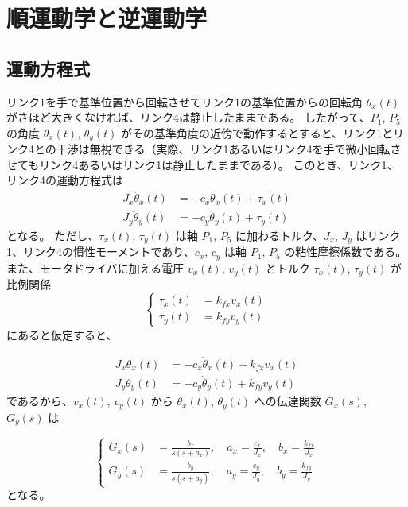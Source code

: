 \section{順運動学と逆運動学}

\subsection{運動方程式}

リンク1を手で基準位置から回転させてリンク1の基準位置からの回転角 $\theta_x(t)$ がさほど大きくなければ、リンク4は静止したままである。
したがって、$P_1$, $P_5$ の角度 $\theta_x(t)$, $\theta_y(t)$ がその基準角度の近傍で動作するとすると、リンク1とリンク4との干渉は無視できる（実際、リンク1あるいはリンク4を手で微小回転させてもリンク4あるいはリンク1は静止したままである）。
このとき、リンク1、リンク4の運動方程式は
\begin{equation}
\begin{aligned}
    J_x \ddot{\theta}_x(t) &= -c_x \dot{\theta}_x(t) + \tau_x(t) \\
    J_y \ddot{\theta}_y(t) &= -c_y \dot{\theta}_y(t) + \tau_y(t)
\end{aligned}
\label{eq:2.1}
\end{equation}
となる。
ただし、$\tau_x(t)$, $\tau_y(t)$ は軸 $P_1$, $P_5$ に加わるトルク、$J_x$, $J_y$ はリンク1、リンク4の慣性モーメントであり、$c_x$, $c_y$ は軸 $P_1$, $P_5$ の粘性摩擦係数である。
また、モータドライバに加える電圧 $v_x(t)$, $v_y(t)$ とトルク $\tau_x(t)$, $\tau_y(t)$ が比例関係
\begin{equation}
\left\{
\begin{aligned}
\tau_x(t) &= k_{fx} v_x(t) \\
\tau_y(t) &= k_{fy} v_y(t)
\end{aligned}
\right.
\label{eq:2.2}
\end{equation}
にあると仮定すると、

\begin{equation}
\begin{aligned}
    J_x \ddot{\theta}_x(t) &= -c_x \dot{\theta}_x(t) + k_{fx} v_x(t) \\
    J_y \ddot{\theta}_y(t) &= -c_y \dot{\theta}_y(t) + k_{fy} v_y(t)
\end{aligned}
\label{eq:2.3}
\end{equation}
であるから、$v_x(t)$, $v_y(t)$ から $\theta_x(t)$, $\theta_y(t)$ への伝達関数 $G_x(s)$, $G_y(s)$ は

\begin{equation}
\left\{
\begin{aligned}
G_x(s) &= \frac{b_x}{s(s+a_x)}, \quad a_x = \frac{c_x}{J_x}, \quad b_x = \frac{k_{fx}}{J_x} \\
G_y(s) &= \frac{b_y}{s(s+a_y)}, \quad a_y = \frac{c_y}{J_y}, \quad b_y = \frac{k_{fy}}{J_y}
\end{aligned}
\right.
\label{eq:2.4}
\end{equation}
となる。

